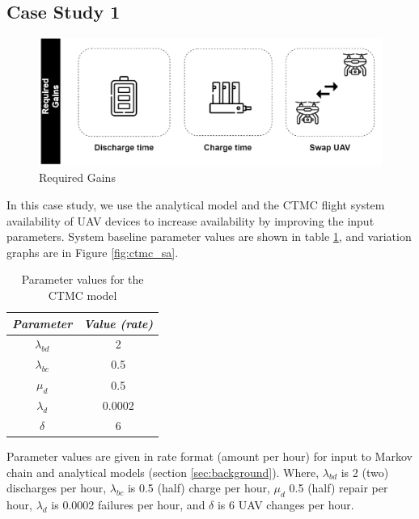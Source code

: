 \documentclass[conference]{IEEEtran}
\begin{document}
\subsection{Case Study 1}\label{sec:case_studies_sub01}

\begin{figure}[htbp]
\centerline{\includegraphics[scale=0.2]{img/operating_model_study_01.png}}
\caption{Required Gains}
\label{fig:case_study_01}
\end{figure}

In this case study, we use the analytical model and the CTMC flight system availability of UAV devices to increase availability by improving the input parameters. System baseline parameter values are shown in table \ref{tab:ctmc_parameter_values}, and variation graphs are in Figure \ref{fig:ctmc_sa}.



\begin{table}[htbp]
\caption{Parameter values for the CTMC model}
\begin{center}
\begin{tabular}{|c|c|}
\hline
\textbf{\textit{Parameter}} & \textbf{\textit{Value (rate)}} \\
\hline
  $\lambda_{bd}$  & 2 \\
  $\lambda_{bc}$   & 0.5 \\
  $\mu_{d}$   & 0.5  \\
  $\lambda_{d}$ & 0.0002 \\
  $\delta$  & 6 \\
\hline
\end{tabular}
\label{tab:ctmc_parameter_values}
\end{center}
\end{table}



Parameter values are given in rate format (amount per hour) for input to Markov chain and analytical models (section \ref{sec:background}). Where, $\lambda_{bd}$ is 2 (two) discharges per hour, $\lambda_{bc}$ is 0.5 (half) charge per hour, $\mu_{d}$ 0.5 (half) repair per hour, $\lambda_{d}$ is 0.0002 failures per hour, and $\delta$ is 6 UAV changes per hour.
\end{document}

